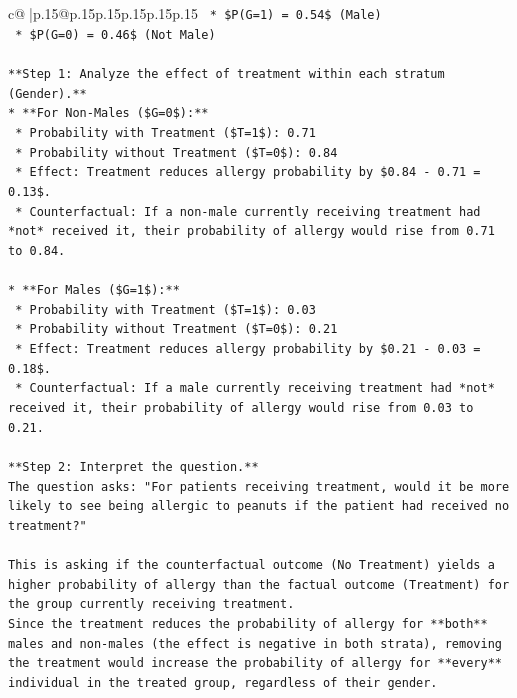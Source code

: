 \documentclass{article}
\begin{document}
{\begin{supertabular}{c@{$\;$}|p{.15\linewidth}@{}p{.15\linewidth}p{.15\linewidth}p{.15\linewidth}p{.15\linewidth}p{.15\linewidth}}
{{{\texttt{    *   \$P(G=1) = 0.54\$ (Male)} \\
\texttt{    *   \$P(G=0) = 0.46\$ (Not Male)} \\
\\ 
\texttt{**Step 1: Analyze the effect of treatment within each stratum (Gender).**} \\
\texttt{*   **For Non{-}Males (\$G=0\$):**} \\
\texttt{    *   Probability with Treatment (\$T=1\$): 0.71} \\
\texttt{    *   Probability without Treatment (\$T=0\$): 0.84} \\
\texttt{    *   Effect: Treatment reduces allergy probability by \$0.84 {-} 0.71 = 0.13\$.} \\
\texttt{    *   Counterfactual: If a non{-}male currently receiving treatment had *not* received it, their probability of allergy would rise from 0.71 to 0.84.} \\
\\ 
\texttt{*   **For Males (\$G=1\$):**} \\
\texttt{    *   Probability with Treatment (\$T=1\$): 0.03} \\
\texttt{    *   Probability without Treatment (\$T=0\$): 0.21} \\
\texttt{    *   Effect: Treatment reduces allergy probability by \$0.21 {-} 0.03 = 0.18\$.} \\
\texttt{    *   Counterfactual: If a male currently receiving treatment had *not* received it, their probability of allergy would rise from 0.03 to 0.21.} \\
\\ 
\texttt{**Step 2: Interpret the question.**} \\
\texttt{The question asks: "For patients receiving treatment, would it be more likely to see being allergic to peanuts if the patient had received no treatment?"} \\
\\ 
\texttt{This is asking if the counterfactual outcome (No Treatment) yields a higher probability of allergy than the factual outcome (Treatment) for the group currently receiving treatment.} \\
\texttt{Since the treatment reduces the probability of allergy for **both** males and non{-}males (the effect is negative in both strata), removing the treatment would increase the probability of allergy for **every** individual in the treated group, regardless of their gender.} \\
\\ 
}}}
\end{supertabular}}
\end{document}
